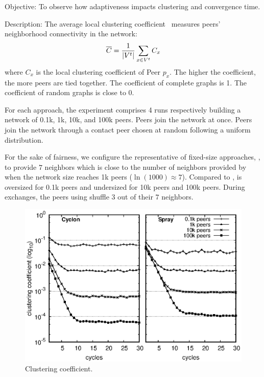 \begin{asparadesc}
\item[Objective:] To observe how adaptiveness impacts clustering and convergence
  time.
\item[Description:] The average local clustering
  coefficient~\cite{watts1998collective} measures peers' neighborhood
  connectivity in the network:
  \begin{equation*}
    \overline{C} = {1\over |V^t|}\sum\limits_{x\in V^t}C_x
  \end{equation*}
  where $C_x$ is the local clustering coefficient of Peer $p_x$. The higher the
  coefficient, the more peers are tied together. The coefficient of complete
  graphs is 1. The coefficient of random graphs is close to 0.  

  For each approach, the experiment comprises 4 runs respectively building a
  network of 0.1k, 1k, 10k, and 100k peers. Peers join the network at
  once. Peers join the network through a contact peer chosen at random following
  a uniform distribution. 
  
  For the sake of fairness, we configure the representative of
  fixed-size approaches, \CYCLON, to provide $7$ neighbors which is
  close to the number of neighbors provided by \SPRAY when the network
  size reaches 1k peers ($\ln(1000)\approx 7$). Compared to \SPRAY,
  \CYCLON is oversized for 0.1k peers and undersized for 10k peers and
  100k peers. During exchanges, the peers using \CYCLON shuffle $3$
  out of their $7$ neighbors.


\begin{figure}
  \centering
  \includegraphics[width=\SCALE\columnwidth]{img/clustering.eps}
  \caption{\label{fig:clustering}Clustering coefficient.}
\end{figure}


\end{asparadesc}
